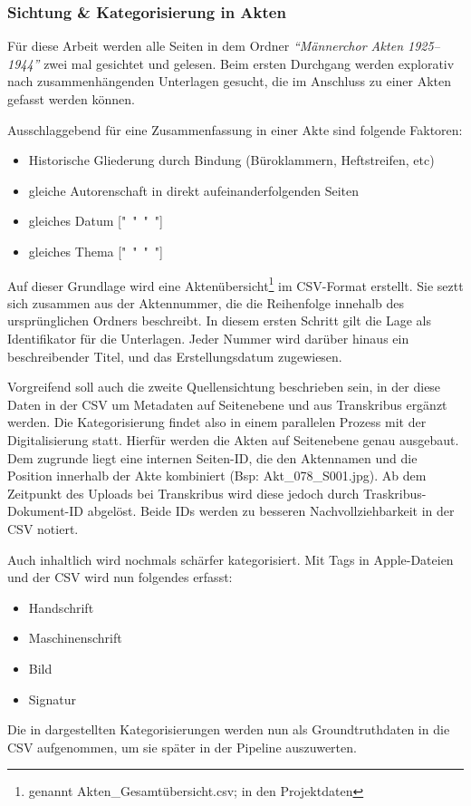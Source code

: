 \documentclass[12pt, a4paper, ngerman, bidi=default]{article}
\begin{document}
\subsubsection{Sichtung \& Kategorisierung in Akten}
Für diese Arbeit werden alle Seiten in dem Ordner \textit{\enquote{Männerchor Akten 1925--1944}} 
zwei mal gesichtet und gelesen. Beim ersten Durchgang werden explorativ nach zusammenhängenden Unterlagen gesucht, die im Anschluss zu einer Akten gefasst werden können.

Ausschlaggebend für eine Zusammenfassung in einer Akte sind folgende Faktoren:
\begin{itemize}
  \item Historische Gliederung durch Bindung (Büroklammern, Heftstreifen, etc)
  \item gleiche Autorenschaft in direkt aufeinanderfolgenden Seiten
  \item gleiches Datum ["~"~"~"]
  \item gleiches Thema ["~"~"~"]
\end{itemize}
Auf dieser Grundlage wird eine Aktenübersicht\footnote{genannt Akten\_Gesamtübersicht.csv; in den Projektdaten} im CSV-Format erstellt. Sie seztt sich zusammen aus der Aktennummer, die die Reihenfolge innehalb des ursprünglichen Ordners beschreibt. In diesem ersten Schritt gilt die Lage als 
Identifikator für die Unterlagen. Jeder Nummer wird darüber hinaus ein beschreibender Titel, und das Erstellungsdatum zugewiesen.

Vorgreifend soll auch die zweite Quellensichtung beschrieben sein, in der diese Daten in der CSV um Metadaten auf Seitenebene und aus Transkribus ergänzt werden. Die Kategorisierung findet also in einem parallelen Prozess mit der Digitalisierung statt.
Hierfür werden die Akten auf Seitenebene genau ausgebaut. Dem zugrunde liegt eine internen Seiten-ID, die den Aktennamen und die Position innerhalb der Akte kombiniert (Bsp: Akt\_078\_S001.jpg). 
Ab dem Zeitpunkt des Uploads bei Transkribus wird diese jedoch durch Traskribus-Dokument-ID abgelöst. Beide IDs werden zu besseren Nachvollziehbarkeit in der CSV notiert.

Auch inhaltlich wird nochmals schärfer kategorisiert. Mit Tags in Apple-Dateien und der CSV wird nun folgendes erfasst:
\begin{itemize}
  \item Handschrift
  \item Maschinenschrift
  \item Bild
  \item Signatur
\end{itemize}
Die in  dargestellten Kategorisierungen werden nun als Groundtruthdaten in die CSV aufgenommen, um sie später in der Pipeline auszuwerten.
\end{document}

